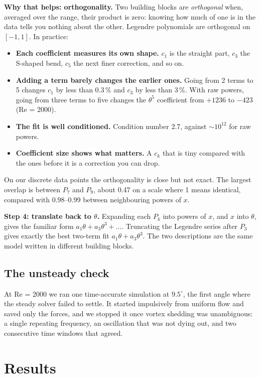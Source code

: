 \documentclass[11pt,a4paper]{article}
\begin{document}
\textbf{Why that helps: orthogonality.} Two building blocks are \emph{orthogonal} when,
averaged over the range, their product is zero: knowing how much of one is in the data
tells you nothing about the other. Legendre polynomials are orthogonal on $[-1,1]$.
In practice:
\begin{itemize}[leftmargin=*]
\item \textbf{Each coefficient measures its own shape.} $c_1$ is the straight part,
  $c_3$ the S-shaped bend, $c_5$ the next finer correction, and so on.
\item \textbf{Adding a term barely changes the earlier ones.} Going from 2 terms to 5
  changes $c_1$ by less than 0.3\,\% and $c_3$ by less than 3\,\%. With raw powers,
  going from three terms to five changes the $\theta^5$ coefficient from $+1236$ to
  $-423$ (Re = 2000).
\item \textbf{The fit is well conditioned.} Condition number 2.7, against
  $\sim 10^{12}$ for raw powers.
\item \textbf{Coefficient size shows what matters.} A $c_k$ that is tiny compared with
  the ones before it is a correction you can drop.
\end{itemize}
On our discrete data points the orthogonality is close but not exact. The largest
overlap is between $P_7$ and $P_9$, about 0.47 on a scale where 1 means identical,
compared with 0.98--0.99 between neighbouring powers of $x$.

\textbf{Step 4: translate back to $\theta$.} Expanding each $P_k$ into powers of $x$,
and $x$ into $\theta$, gives the familiar form $a_1\theta + a_3\theta^3 + \dots$.
Truncating the Legendre series after $P_3$ gives exactly the best two-term fit
$a_1\theta + a_3\theta^3$. The two descriptions are the same model written in
different building blocks.

\FloatBarrier
\subsection{The unsteady check}
\label{sec:unsteady-method}

At Re = 2000 we ran one time-accurate simulation at $9.5^\circ$, the first angle where
the steady solver failed to settle. It started impulsively from uniform flow and saved
only the forces, and we stopped it once vortex shedding was unambiguous: a single
repeating frequency, an oscillation that was not dying out, and two consecutive time
windows that agreed.

\section{Results}
\end{document}
